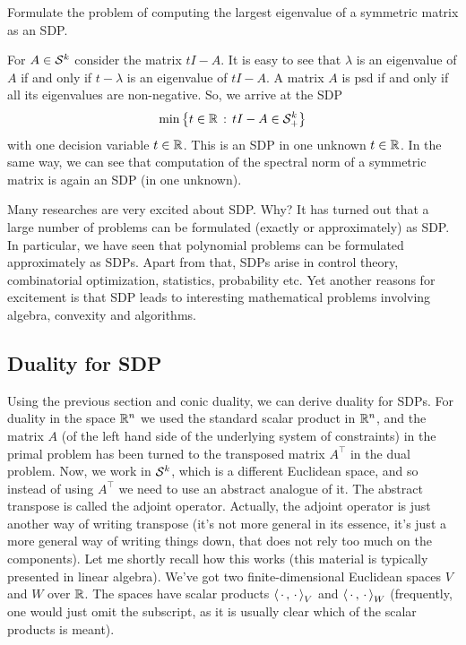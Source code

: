 \begin{exercise}
	Formulate the problem of computing the largest eigenvalue of a symmetric matrix as an SDP. 
\end{exercise}
\begin{solution}
	For $A \in \mathcal{S}^k$ consider the matrix $t I - A$. It is easy to see that $\lambda$ is an eigenvalue of $A$ if and only if $t-\lambda$ is an eigenvalue of $t I - A$. A matrix $A$ is psd if and only if all its eigenvalues are non-negative. So, we arrive at the SDP
\begin{align*}
	\min \left\{ t \in \mathbb{R} \,:\,  t I - A \in \mathcal{S}_+^k \right\}
\end{align*}
with one decision variable $t \in \mathbb{R}$.
This is an SDP in one unknown $t \in \mathbb{R}$. 
In the same way, we can see that computation of the spectral norm of a symmetric matrix is again an SDP (in one unknown).
\end{solution}

\begin{remark}
	Many researches are very excited about SDP. Why? It has turned out that a large number of problems can be formulated (exactly or approximately) as SDP. In particular, we have seen that polynomial problems can be formulated approximately as SDPs. Apart from that, SDPs arise in control theory, combinatorial optimization, statistics, probability etc. Yet another reasons for excitement is that SDP leads to interesting mathematical problems involving algebra, convexity and algorithms. 
\end{remark}

\subsection{Duality for SDP}

Using the previous section and conic duality, we can derive duality for SDPs. For duality in the space $\mathbb{R}^n$ we used the standard scalar product in $\mathbb{R}^n$, and the matrix $A$ (of the left hand side of the underlying system of constraints) in the primal problem has been turned to the transposed matrix $A^\top$ in the dual problem. Now, we work in $\mathcal{S}^k$, which is a different Euclidean space, and so instead of using $A^\top$ we need to use an abstract analogue of it. The abstract transpose is called the adjoint operator. Actually, the adjoint operator is just another way of writing transpose (it's not more general in its essence, it's just a more general way of writing things down, that does not rely too much on the components). Let me shortly recall how this works (this material is typically presented in linear algebra). We've got two finite-dimensional Euclidean spaces $V$ and $W$ over $\mathbb{R}$. The spaces have scalar products  $\left\langle \, \cdot \, , \, \cdot \, \right\rangle_V$ and $\left\langle \, \cdot \, , \, \cdot \, \right\rangle_W$ (frequently, one would just omit the subscript, as it is usually clear which of the scalar products is meant). 

